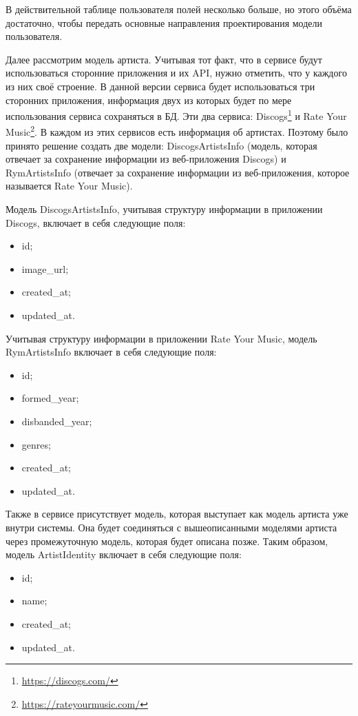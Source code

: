В действительной таблице пользователя полей несколько больше, но этого объёма достаточно, чтобы передать основные направления проектирования модели пользователя.

Далее рассмотрим модель артиста. Учитывая тот факт, что в сервисе будут использоваться сторонние приложения и их API, нужно отметить, что у каждого из них своё строение. В данной версии сервиса будет использоваться три сторонних приложения, информация двух из которых будет по мере использования сервиса сохраняться в БД. Эти два сервиса: Discogs\footnote{\url{https://discogs.com/}} и Rate Your Music\footnote{\url{https://rateyourmusic.com/}}. В каждом из этих сервисов есть информация об артистах. Поэтому было принято решение создать две модели: DiscogsArtistsInfo (модель, которая отвечает за сохранение информации из веб-приложения Discogs) и RymArtistsInfo (отвечает за сохранение информации из веб-приложения, которое называется Rate Your Music).

Модель DiscogsArtistsInfo, учитывая структуру информации в приложении Discogs, включает в себя следующие поля:

\begin{itemize}
  \item id;
  \item image\_url;
  \item created\_at;
  \item updated\_at.
\end{itemize}

Учитывая структуру информации в приложении Rate Your Music, модель RymArtistsInfo включает в себя следующие поля:

\begin{itemize}
  \item id;
  \item formed\_year;
  \item disbanded\_year;
  \item genres;
  \item created\_at;
  \item updated\_at.
\end{itemize}

Также в сервисе присутствует модель, которая выступает как модель артиста уже внутри системы. Она будет соединяться с вышеописанными моделями артиста через промежуточную модель, которая будет описана позже. Таким образом, модель ArtistIdentity включает в себя следующие поля:

\begin{itemize}
  \item id;
  \item name;
  \item created\_at;
  \item updated\_at.
\end{itemize}

